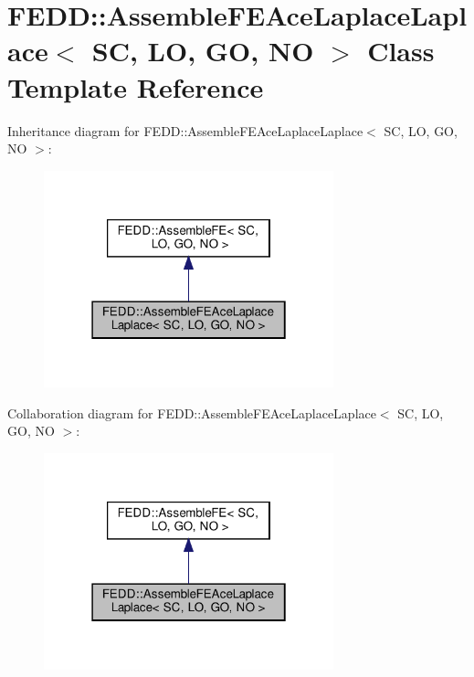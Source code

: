 \hypertarget{classFEDD_1_1AssembleFEAceLaplaceLaplace}{}\section{F\+E\+DD\+:\+:Assemble\+F\+E\+Ace\+Laplace\+Laplace$<$ SC, LO, GO, NO $>$ Class Template Reference}
\label{classFEDD_1_1AssembleFEAceLaplaceLaplace}


Inheritance diagram for F\+E\+DD\+:\+:Assemble\+F\+E\+Ace\+Laplace\+Laplace$<$ SC, LO, GO, NO $>$\+:\nopagebreak
\begin{figure}[H]
\begin{center}
\leavevmode
\includegraphics[width=238pt]{classFEDD_1_1AssembleFEAceLaplaceLaplace__inherit__graph}
\end{center}
\end{figure}


Collaboration diagram for F\+E\+DD\+:\+:Assemble\+F\+E\+Ace\+Laplace\+Laplace$<$ SC, LO, GO, NO $>$\+:\nopagebreak
\begin{figure}[H]
\begin{center}
\leavevmode
\includegraphics[width=238pt]{classFEDD_1_1AssembleFEAceLaplaceLaplace__coll__graph}
\end{center}
\end{figure}
